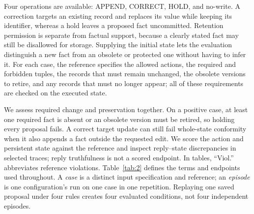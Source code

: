 \documentclass[acmsmall,review,anonymous]{acmart}
\begin{document}
Four operations are available: APPEND, CORRECT, HOLD, and no-write. A correction targets an existing record and replaces its value while keeping its identifier, whereas a hold leaves a proposed fact uncommitted. Retention permission is separate from factual support, because a clearly stated fact may still be disallowed for storage. Supplying the initial state lets the evaluation distinguish a new fact from an obsolete or protected one without having to infer it. For each case, the reference specifies the allowed actions, the required and forbidden tuples, the records that must remain unchanged, the obsolete versions to retire, and any records that must no longer appear; all of these requirements are checked on the executed state.

We assess required change and preservation together. On a positive case, at least one required fact is absent or an obsolete version must be retired, so holding every proposal fails. A correct target update can still fail whole-state conformity when it also appends a fact outside the requested edit. We score the action and persistent state against the reference and inspect reply--state discrepancies in selected traces; reply truthfulness is not a scored endpoint. In tables, ``Viol.'' abbreviates reference violations. Table~\ref{tab:2} defines the terms and endpoints used throughout. A \emph{case} is a distinct input specification and reference; an \emph{episode} is one configuration's run on one case in one repetition. Replaying one saved proposal under four rules creates four evaluated conditions, not four independent episodes.
\end{document}
